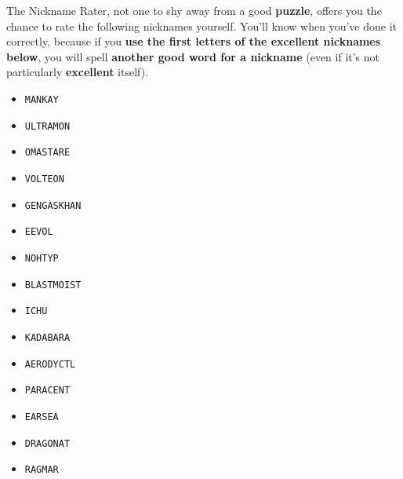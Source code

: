 The Nickname Rater, not one to shy away from a good \textbf{puzzle},
offers you the chance to rate the following nicknames yourself.
You'll know when you've done it correctly, because
if you \textbf{use the first letters of the excellent
nicknames below}, you will spell \textbf{another good word for a nickname}
(even if it's not particularly \textbf{excellent} itself).


\begin{multicols}{3}
  \begin{itemize}
    \item \texttt{MANKAY} %
    \item \texttt{ULTRAMON} %
    \item \texttt{OMASTARE} %
    \item \texttt{VOLTEON} %
    \item \texttt{GENGASKHAN} %
    \item \texttt{EEVOL} %
    \item \texttt{NOHTYP} %
    \item \texttt{BLASTMOIST} %
    \item \texttt{ICHU} %
    \item \texttt{KADABARA} %
    \item \texttt{AERODYCTL} %
    \item \texttt{PARACENT} %
    \item \texttt{EARSEA} %
    \item \texttt{DRAGONAT} %
    \item \texttt{RAGMAR} %
  \end{itemize}
\end{multicols}

